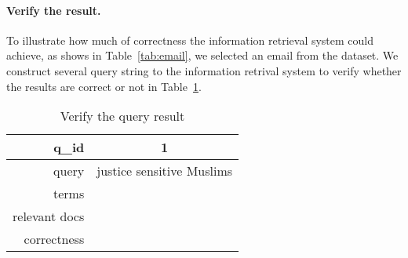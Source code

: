 \paragraph{Verify the result.} To illustrate how much of correctness the information retrieval system could achieve, as shows in Table~\ref{tab:email}, we selected an email from the dataset.
We construct several query string to the information retrival system to verify whether the results are correct or not in Table~\ref{tab:query}. 
\begin{table}[!ht]
	\centering
	\begin{tabular}{r|c}
		\toprule
		q\_id& 1 \\
		\midrule
		query & justice sensitive Muslims\\
		terms &  \\ 
		relevant docs & \\
		correctness & \\
		\bottomrule
	\end{tabular}
	\caption{Verify the query result}
	\label{tab:query}
\end{table}

